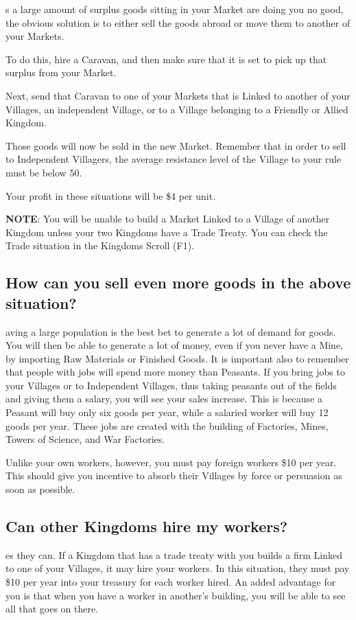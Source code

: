 s a large amount of surplus goods sitting in your Market are doing you no good, the obvious solution is to either sell the goods abroad or move them to another of your Markets.

To do this, hire a Caravan, and then make sure that it is set to pick up that surplus from your Market.

Next, send that Caravan to one of your Markets that is Linked to another of your Villages, an independent Village, or to a Village belonging to a Friendly or Allied Kingdom.

Those goods will now be sold in the new Market. Remember that in order to sell to Independent Villagers, the average resistance level of the Village to your rule must be below 50.

Your profit in these situations will be \$4 per unit.

\textbf{NOTE}: You will be unable to build a Market Linked to a Village of another Kingdom unless your two Kingdoms have a Trade Treaty. You can check the Trade situation in the Kingdoms Scroll (F1).

\subsection{How can you sell even more goods in the above situation?}

aving a large population is the best bet to generate a lot of demand for goods. You will then be able to generate a lot of money, even if you never have a Mine, by importing Raw Materials or Finished Goods. It is important also to remember that people with jobs will spend more money than Peasants. If you bring jobs to your Villages or to Independent Villages, thus taking peasants out of the fields and giving them a salary, you will see your sales increase. This is because a Peasant will buy only six goods per year, while a salaried worker will buy 12 goods per year. These jobs are created with the building of Factories, Mines, Towers of Science, and War Factories.

Unlike your own workers, however, you must pay foreign workers \$10 per year. This should give you incentive to absorb their Villages by force or persuasion as soon as possible.

\subsection{Can other Kingdoms hire my workers?}

es they can. If a Kingdom that has a trade treaty with you builds a firm Linked to one of your Villages, it may hire your workers. In this situation, they must pay \$10 per year into your treasury for each worker hired. An added advantage for you is that when you have a worker in another’s building, you will be able to see all that goes on there.